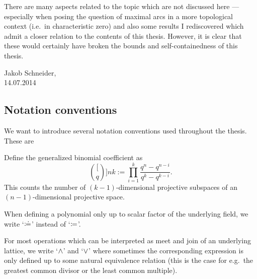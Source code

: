 There are many aspects related to the topic which are not discussed here --- especially when posing the question of maximal arcs in a more topological context (i.e.~in characteristic zero) and also some results I rediscovered which admit a closer relation to the contents of this thesis. However, it is clear that these would certainly have broken the bounds and self-containedness of this thesis.

\begin{flushright}
    Jakob Schneider,\\
    14.07.2014
\end{flushright}

\subsection*{Notation conventions}

We want to introduce several notation conventions used throughout the thesis.
These are 
\begin{definition}
    Define the generalized binomial coefficient as
    $$
    \binom[q]{n}{k}:= \prod_{i=1}^{k}{\frac{q^n-q^{n-i}}{q^k-q^{k-i}}}.
    $$
    This counts the number of $(k-1)$-dimensional projective subspaces of an $(n-1)$-dimensional projective space.
\end{definition}

When defining a polynomial only up to scalar factor of the underlying field, we write `$\mathrel{\mathrel{\mathop:}\mkern-1.2mu\doteq}$' instead of `$\mathrel{\mathrel{\mathop:}\mkern-1.2mu=}$'.

For most operations which can be interpreted as meet and join of an underlying lattice, we write `$\wedge$' and `$\vee$' where sometimes the corresponding expression is only defined up to some natural equivalence relation (this is the case for e.g.~the greatest common divisor or the least common multiple).


